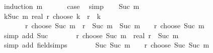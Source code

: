\begin{isabellebody}
%
\isadelimproof
%
\endisadelimproof
%
\isatagproof
{}\isamarkupfalse%
\ {\isacharparenleft}{\kern0pt}induction\ m{\isacharparenright}{\kern0pt}\isanewline
\ \ \isamarkupfalse%
\ {}\ \isamarkupfalse%
\ {\isacharquery}{\kern0pt}case\ \isamarkupfalse%
\ simp\isanewline
{}\isamarkupfalse%
\isanewline
\ \ \isamarkupfalse%
\ {\isacharparenleft}{\kern0pt}Suc\ m{\isacharparenright}{\kern0pt}\isanewline
\ \ \isamarkupfalse%
\ {\isachardoublequoteopen}{\isacharparenleft}{\kern0pt}{\isasymSum}k{\isasymle}Suc\ m{\isachardot}{\kern0pt}\ real\ {\isacharparenleft}{\kern0pt}r\ choose\ k{\isacharparenright}{\kern0pt}\ {\isacharasterisk}{\kern0pt}\ {\isacharparenleft}{\kern0pt}r{\isacharslash}{\kern0pt}{}\ {\isacharminus}{\kern0pt}\ k{\isacharparenright}{\kern0pt}{\isacharparenright}{\kern0pt}\ \isanewline
\ \ \ \ \ \ {\isacharequal}{\kern0pt}\ {\isacharparenleft}{\kern0pt}{\isacharparenleft}{\kern0pt}r\ choose\ Suc\ m{\isacharparenright}{\kern0pt}\ {\isacharasterisk}{\kern0pt}\ {\isacharparenleft}{\kern0pt}r{\isacharslash}{\kern0pt}{}\ {\isacharminus}{\kern0pt}\ {\isacharparenleft}{\kern0pt}Suc\ m{\isacharparenright}{\kern0pt}{\isacharparenright}{\kern0pt}{\isacharparenright}{\kern0pt}\ {\isacharplus}{\kern0pt}\ {\isacharparenleft}{\kern0pt}Suc\ m{\isacharparenright}{\kern0pt}\ {\isacharslash}{\kern0pt}\ {}\ {\isacharasterisk}{\kern0pt}\ {\isacharparenleft}{\kern0pt}r\ choose\ Suc\ m{\isacharparenright}{\kern0pt}{\isachardoublequoteclose}\isanewline
\ \ \ \ \isamarkupfalse%
\ {\isacharparenleft}{\kern0pt}simp\ add{\isacharcolon}{\kern0pt}\ Suc{\isacharparenright}{\kern0pt}\isanewline
\ \ \isamarkupfalse%
\ \isamarkupfalse%
\ {\isachardoublequoteopen}{\isasymdots}\ {\isacharequal}{\kern0pt}\ {\isacharparenleft}{\kern0pt}r\ choose\ Suc\ m{\isacharparenright}{\kern0pt}\ {\isacharasterisk}{\kern0pt}\ {\isacharparenleft}{\kern0pt}real\ r\ {\isacharminus}{\kern0pt}\ {\isacharparenleft}{\kern0pt}Suc\ m{\isacharparenright}{\kern0pt}{\isacharparenright}{\kern0pt}\ {\isacharslash}{\kern0pt}\ {}{\isachardoublequoteclose}\isanewline
\ \ \ \ \isamarkupfalse%
\ {\isacharparenleft}{\kern0pt}simp\ add{\isacharcolon}{\kern0pt}\ field{\isacharunderscore}{\kern0pt}simps{\isacharparenright}{\kern0pt}\isanewline
\ \ \isamarkupfalse%
\ \isamarkupfalse%
\ {\isachardoublequoteopen}{\isasymdots}\ {\isacharequal}{\kern0pt}\ Suc\ {\isacharparenleft}{\kern0pt}Suc\ m{\isacharparenright}{\kern0pt}\ {\isacharslash}{\kern0pt}\ {}\ {\isacharasterisk}{\kern0pt}\ {\isacharparenleft}{\kern0pt}r\ choose\ Suc\ {\isacharparenleft}{\kern0pt}Suc\ m{\isacharparenright}{\kern0pt}{\isacharparenright}{\kern0pt}{\isachardoublequoteclose}\isanewline

\end{isabellebody}
